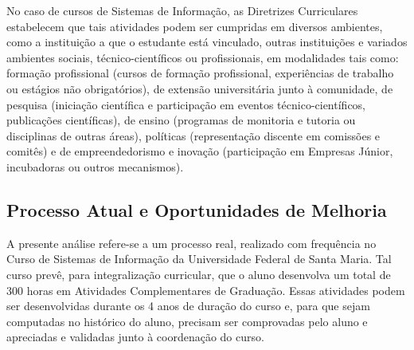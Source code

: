 \documentclass[12pt]{article}
\begin{document}
No caso de cursos de Sistemas de Informação, as Diretrizes Curriculares estabelecem que tais atividades podem ser cumpridas em diversos ambientes, como a instituição a que o estudante está vinculado, outras instituições e variados ambientes sociais, técnico-científicos ou profissionais, em modalidades tais como: formação profissional (cursos de formação profissional, experiências de trabalho ou estágios não obrigatórios), de extensão universitária junto à comunidade, de pesquisa (iniciação científica e participação em eventos técnico-científicos, publicações científicas), de ensino (programas de monitoria e tutoria ou disciplinas de outras áreas), políticas (representação discente em comissões e comitês) e de empreendedorismo e inovação (participação em Empresas Júnior, incubadoras ou outros mecanismos).


\subsection{Processo Atual e Oportunidades de Melhoria}

A presente análise refere-se a um processo real, realizado com frequência no Curso de Sistemas de Informação da Universidade Federal de Santa Maria. Tal curso prevê, para integralização curricular, que o aluno desenvolva um total de 300 horas em Atividades Complementares de Graduação. Essas atividades podem ser desenvolvidas durante os 4 anos de duração do curso e, para que sejam computadas no histórico do aluno, precisam ser comprovadas pelo aluno e apreciadas e validadas junto à coordenação do curso.
\end{document}
